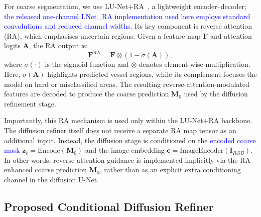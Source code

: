 \documentclass[jimaging,article,submit,pdftex,moreauthors]
  {Definitions/mdpi}
\DeclareRobustCommand{\rev}[1]{\textcolor{blue}{#1}}
\DeclareRobustCommand{\rev}[1]{#1}
\providecommand{\linelabel}[1]{}
\newcommand{\seclabel}[1]{\linelabel{rev:sec:#1}}
\begin{document}
For coarse segmentation, we use LU-Net+RA~\cite{Hernandez2025}, a lightweight encoder--decoder\rev{; the released one-channel LNet\_RA implementation used here employs standard convolutions and reduced channel widths}. Its key component is reverse attention (RA), which emphasises uncertain regions. Given a feature map $\mathbf{F}$ and attention logits $\mathbf{A}$, the RA output is:
\begin{equation}
\mathbf{F}^{\text{RA}} = \mathbf{F}\otimes \left(1-\sigma(\mathbf{A})\right),
\end{equation}
where $\sigma(\cdot)$ is the sigmoid function and $\otimes$ denotes element-wise multiplication. Here, $\sigma(\mathbf{A})$ highlights predicted vessel regions, while its complement focuses the model on hard or misclassified areas. The resulting reverse-attention-modulated features are decoded to produce the coarse prediction $\mathbf{M}_0$ used by the diffusion refinement stage.

Importantly, this RA mechanism is used only within the LU-Net+RA backbone. The diffusion refiner itself does not receive a separate RA map tensor as an additional input. Instead, the diffusion stage is conditioned on the \rev{encoded coarse mask} $\mathbf{z}_c=\mathrm{Encode}(\mathbf{M}_0)$ and the image embedding $\mathbf{c}=\mathrm{ImageEncoder}(\mathbf{I}_{RGB})$. In other words, reverse-attention guidance is implemented implicitly via the RA-enhanced coarse prediction $\mathbf{M}_0$, rather than as an explicit extra conditioning channel in the diffusion U-Net.

\subsection{Proposed Conditional Diffusion Refiner}
\label{sec:refiner}
\seclabel{refiner}
\end{document}
